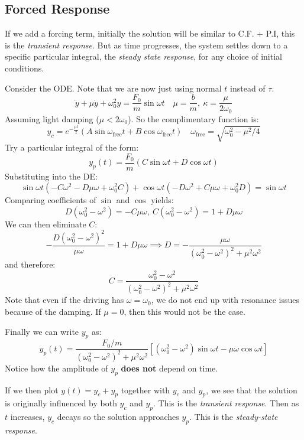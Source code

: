 \documentclass[../main.tex]{subfiles}
\begin{document}
\subsection{Forced Response}
If we add a forcing term, initially the solution will be similar to C.F. + P.I, this is the \textit{transient response}.
But as time progresses, the system settles down to a specific particular integral, the \textit{steady state response}, for any choice of initial conditions.
\begin{example}
  Consider the ODE.
  Note that we are now just using normal $t$ instead of $\tau$.
  \[
    \ddot{y} + \mu \dot{y} + \omega^{2}_{0}y = \frac{F_0}{m}\sin \omega t \quad \mu = \frac{b}{m},\ \kappa = \frac{\mu}{2\omega_0}
  \]
  Assuming light damping ($\mu < 2 \omega_0$).
  So the complimentary function is:
  \[
    y_c = e^{-\frac{\mu t}{2}}(A\sin\omega_{\text{free}}t + B\cos\omega_{\text{free}}t) \quad \omega_{\text{free}} = \sqrt{\omega^{2}_{0} - \mu^2/4}
  \]
  Try a particular integral of the form:
  \[
    y_p(t) = \frac{F_0}{m}(C\sin\omega t+ D\cos \omega t)
  \]
  Substituting into the DE:
  \[
    \sin \omega t(-C\omega^2-D\mu\omega + \omega^{2}_{0}C) + \cos \omega t(-D\omega^2 + C\mu\omega + \omega^{2}_{0}D) = \sin \omega t
  \]
  Comparing coefficients of $\sin$ and $\cos$ yields:
  \[
    D(\omega^{2}_{0} - \omega^2) = -C\mu\omega,\ C(\omega^{2}_{0} - \omega^2) = 1 + D\mu\omega
  \]
  We can then eliminate $C$:
  \[
    -\frac{D(\omega^{2}_{0} - \omega^2)^2}{\mu \omega} = 1 + D\mu\omega \implies D = -\frac{\mu\omega}{(\omega^{2}_{0}-\omega^2)^2 + \mu^2\omega^2}
  \]
  and therefore:
  \[
    C = \frac{\omega^{2}_{0} - \omega^2}{(\omega^{2}_{0} - \omega^2)^2 + \mu^2\omega^2}
  \]
  Note that even if the driving has $\omega = \omega_0$, we do not end up with resonance issues because of the damping.
  If $\mu = 0$, then this would not be the case.

  Finally we can write $y_p$ as:
  \[
    y_p(t) = \frac{F_0/m}{(\omega^{2}_{0} - \omega^2)^2 +\mu^2\omega^2}[(\omega^{2}_{0} - \omega^2)\sin\omega t - \mu \omega \cos \omega t]
  \]
  Notice how the amplitude of $y_p$ \textbf{does not} depend on time.

  If we then plot $y(t) = y_c + y_p$ together with $y_c$ and $y_p$, we see that the solution is originally influenced by both $y_c$ and $y_p$.
  This is the \textit{transient response}.
  Then as $t$ increases, $y_c$ decays so the solution approaches $y_p$.
  This is the \textit{steady-state response}.
  \begin{center}
\end{center}
\end{example}
\end{document}
